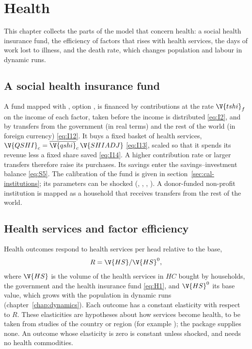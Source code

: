 \chapter{Health}\label{chap:health}

This chapter collects the parts of the model that concern health: a social
health insurance fund, the efficiency of factors that rises with health
services, the days of work lost to illness, and the death rate, which changes
population and labour in dynamic runs.

\section{A social health insurance fund}\label{sec:fund}

A fund mapped with , option , is financed by
contributions at the rate $\V{tshi}_f$ on the income of each factor, taken
before the income is distributed \eqref{eq:I2}, and by transfers from the
government (in real terms) and the rest of the world (in foreign currency)
\eqref{eq:I12}. It buys a fixed basket of health services,
$\V{QSHI}_c = \overline{\V{qshi}}_c\,\V{SHIADJ}$ \eqref{eq:I13}, scaled so
that it spends its revenue less a fixed share saved \eqref{eq:I14}. A higher
contribution rate or larger transfers therefore raise its purchases. Its
savings enter the savings--investment balance \eqref{eq:S5}. The calibration
of the fund is given in section~\ref{sec:cal-institutions}; its parameters
can be shocked (, , , ). A
donor-funded non-profit institution is mapped as a household that receives
transfers from the rest of the world.

\section{Health services and factor efficiency}\label{sec:efficiency}

Health outcomes respond to health services per head relative to the base,
\begin{equation*}
R = \V{HS} / \V{HS}^0,
\end{equation*}
where $\V{HS}$ is the volume of the health services in $HC$ bought by
households, the government and the health insurance fund \eqref{eq:H1}, and
$\V{HS}^0$ its base value, which grows with the population in dynamic runs
(chapter~\ref{chap:dynamics}). Each outcome has a constant elasticity with
respect to $R$. These elasticities are hypotheses about how services become
health, to be taken from studies of the country or region (for example
\citealt{bokhari2007}); the package supplies none. An outcome whose elasticity
is zero is constant unless shocked, and needs no health commodities.

